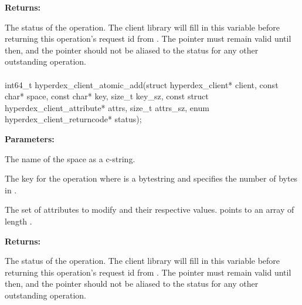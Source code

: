 \noindent\textbf{Returns:}
\begin{description}[labelindent=\widthof{{\code{status}}},leftmargin=*,noitemsep,nolistsep,align=right]
\item[\code{status}] The status of the operation.  The client library will fill in this variable before returning this operation's request id from .  The pointer must remain valid until then, and the pointer should not be aliased to the status for any other outstanding operation.
\end{description}

\paragraph{}
\label{api:c:atomic_add}
\begin{ccode}
int64_t hyperdex_client_atomic_add(struct hyperdex_client* client,
                const char* space,
                const char* key, size_t key_sz,
                const struct hyperdex_client_attribute* attrs, size_t attrs_sz,
                enum hyperdex_client_returncode* status);
\end{ccode}
\funcdesc 

\noindent\textbf{Parameters:}
\begin{description}[labelindent=\widthof{{\code{attrs}, \code{attrs\_sz}}},leftmargin=*,noitemsep,nolistsep,align=right]
\item[\code{space}] The name of the space as a c-string.
\item[\code{key}, \code{key\_sz}] The key for the operation where  is a bytestring and  specifies the number of bytes in .
\item[\code{attrs}, \code{attrs\_sz}] The set of attributes to modify and their respective values.   points to an array of length .
\end{description}

\noindent\textbf{Returns:}
\begin{description}[labelindent=\widthof{{\code{status}}},leftmargin=*,noitemsep,nolistsep,align=right]
\item[\code{status}] The status of the operation.  The client library will fill in this variable before returning this operation's request id from .  The pointer must remain valid until then, and the pointer should not be aliased to the status for any other outstanding operation.
\end{description}

